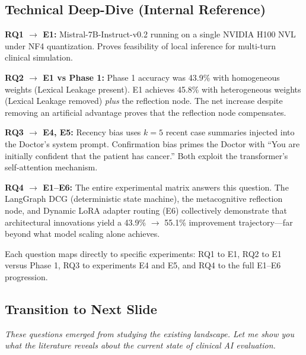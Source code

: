 \documentclass[12pt]{article}
\begin{document}
  \subsection*{Technical Deep-Dive (Internal Reference)}
  {\color{techgray}
  \textbf{RQ1 $\to$ E1:} Mistral-7B-Instruct-v0.2 running on a single NVIDIA H100 NVL under NF4 quantization. Proves feasibility of local inference for multi-turn clinical simulation.

  \textbf{RQ2 $\to$ E1 vs Phase 1:} Phase 1 accuracy was 43.9\% with homogeneous weights (Lexical Leakage present). E1 achieves 45.8\% with heterogeneous weights (Lexical Leakage removed) \textit{plus} the reflection node. The net increase despite removing an artificial advantage proves that the reflection node compensates.

  \textbf{RQ3 $\to$ E4, E5:} Recency bias uses $k=5$ recent case summaries injected into the Doctor's system prompt. Confirmation bias primes the Doctor with ``You are initially confident that the patient has cancer.'' Both exploit the transformer's self-attention mechanism.

  \textbf{RQ4 $\to$ E1--E6:} The entire experimental matrix answers this question. The LangGraph DCG (deterministic state machine), the metacognitive reflection node, and Dynamic LoRA adapter routing (E6) collectively demonstrate that architectural innovations yield a 43.9\% $\to$ 55.1\% improvement trajectory---far beyond what model scaling alone achieves.

  Each question maps directly to specific experiments: RQ1 to E1, RQ2 to E1 versus Phase 1, RQ3 to experiments E4 and E5, and RQ4 to the full E1--E6 progression.
  }

  \subsection*{Transition to Next Slide}
  {\color{transgreen}
  \textit{These questions emerged from studying the existing landscape. Let me show you what the literature reveals about the current state of clinical AI evaluation.}
  }
\end{document}
